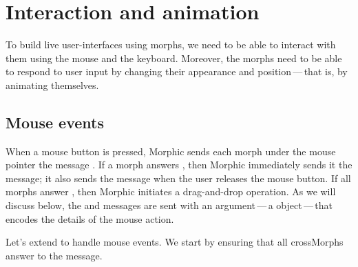 \documentclass[a4paper,10pt,twoside]{book}
\begin{document}



\section{Interaction and animation}

To build live user-interfaces using morphs, we need to be able to interact with them using the mouse and the keyboard.
Moreover, the morphs need to be able to respond to user input by changing their appearance and position\,---\,that is, by animating themselves.


\subsection{Mouse events}

When a mouse button is pressed, Morphic sends each morph under the mouse pointer the message .
If a morph answers , then Morphic immediately sends it the  message; it also sends the  message when the user releases the mouse button.
If all morphs answer , then Morphic initiates a drag-and-drop operation.
As we will discuss below, the  and  messages are sent with an argument\,---\,a  object\,---\,that encodes the details of the mouse action.

Let's extend  to handle mouse events.
We start by ensuring that all crossMorphs answer  to the  message.
\end{document}
